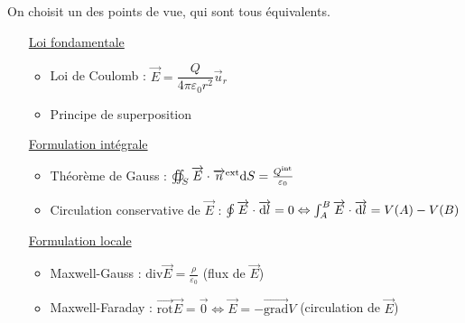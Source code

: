         On choisit un des points de vue, qui sont tous équivalents.
        \begin{enumerate}[align=left]
            \item [\underline{Loi fondamentale}]\phantom{}
            \begin{itemize}
                \item Loi de Coulomb : $\vec{E}=\dfrac{Q}{4\pi\varepsilon_0 r^{2}}\vec{u}_r$
                \item Principe de superposition
            \end{itemize}
            \item [\underline{Formulation intégrale}]\phantom{}
            \begin{itemize}
                \item Théorème de Gauss : $\oiint_{S}\protect\overrightarrow{{E}}\cdot\protect\overrightarrow{{n}}^{\text{ext}}\mathrm{d} S=\frac{Q^{\text{int}}}{\varepsilon_0}$
                \item Circulation conservative de $\vec{E}$ : $\oint\protect\overrightarrow{{E}}\cdot\protect\overrightarrow{{\mathrm{d} l}}=0\Leftrightarrow\int_{A}^{B}\protect\overrightarrow{{E}}\cdot\protect\overrightarrow{{\mathrm{d} l}}=V(A)-V(B)$
            \end{itemize}
            \item [\underline{Formulation locale}]\phantom{}
            \begin{itemize}
                \item Maxwell-Gauss : $\mathrm{div}\vec{E}=\frac{\rho}{\varepsilon_0}$ (flux de $\vec{E}$)
                \item Maxwell-Faraday : $\vec{\mathrm{rot}}\vec{E}=\vec{0}\Leftrightarrow\vec{E}=-\vec{\mathrm{grad}}V$ (circulation de $\vec{E}$)
            \end{itemize}
        \end{enumerate}
        